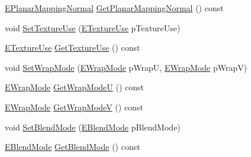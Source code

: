 \begin{DoxyCompactItemize}
\item 
\hyperlink{class_fbx_texture_a6115b6970e4c83198112530d1e6f578c}{E\+Planar\+Mapping\+Normal} \hyperlink{class_fbx_texture_ad15e77afddc395d9da4ee442c769c167}{Get\+Planar\+Mapping\+Normal} () const
\item 
void \hyperlink{class_fbx_texture_aa1bb097d19a2b92f64abde250388df0d}{Set\+Texture\+Use} (\hyperlink{class_fbx_texture_af034d10e711237dd9ae92a5965787f25}{E\+Texture\+Use} p\+Texture\+Use)
\item 
\hyperlink{class_fbx_texture_af034d10e711237dd9ae92a5965787f25}{E\+Texture\+Use} \hyperlink{class_fbx_texture_aada6ca015322195cddfa90ccb5274e31}{Get\+Texture\+Use} () const
\item 
void \hyperlink{class_fbx_texture_afb9383ff8cc503b4446247ccdd634ef1}{Set\+Wrap\+Mode} (\hyperlink{class_fbx_texture_ae273dffe3ff532dfd57e7bdb15b121fd}{E\+Wrap\+Mode} p\+WrapU, \hyperlink{class_fbx_texture_ae273dffe3ff532dfd57e7bdb15b121fd}{E\+Wrap\+Mode} p\+WrapV)
\item 
\hyperlink{class_fbx_texture_ae273dffe3ff532dfd57e7bdb15b121fd}{E\+Wrap\+Mode} \hyperlink{class_fbx_texture_a4df1c01895bf8fb995a5c031de7b77fe}{Get\+Wrap\+ModeU} () const
\item 
\hyperlink{class_fbx_texture_ae273dffe3ff532dfd57e7bdb15b121fd}{E\+Wrap\+Mode} \hyperlink{class_fbx_texture_abf31cda728e2ff7f94e10dca19de19d2}{Get\+Wrap\+ModeV} () const
\item 
void \hyperlink{class_fbx_texture_a8809f20ef579aea161142784dc671ec9}{Set\+Blend\+Mode} (\hyperlink{class_fbx_texture_af1e8597086589ba6b8ba0066d47b6b63}{E\+Blend\+Mode} p\+Blend\+Mode)
\item 
\hyperlink{class_fbx_texture_af1e8597086589ba6b8ba0066d47b6b63}{E\+Blend\+Mode} \hyperlink{class_fbx_texture_ad9f85f7fe1bb43f263f2edddeb9df443}{Get\+Blend\+Mode} () const
\end{DoxyCompactItemize}
